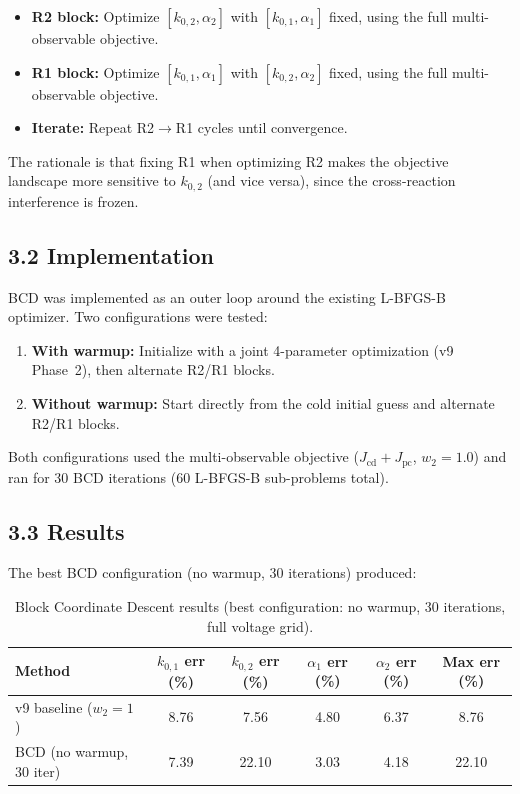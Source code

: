 \documentclass[11pt]{article}
\begin{document}
\begin{itemize}
  \item \textbf{R2 block:} Optimize $[k_{0,2}, \alpha_2]$ with $[k_{0,1},
        \alpha_1]$ fixed, using the full multi-observable objective.
  \item \textbf{R1 block:} Optimize $[k_{0,1}, \alpha_1]$ with $[k_{0,2},
        \alpha_2]$ fixed, using the full multi-observable objective.
  \item \textbf{Iterate:} Repeat R2$\to$R1 cycles until convergence.
\end{itemize}

The rationale is that fixing R1 when optimizing R2 makes the objective
landscape more sensitive to $k_{0,2}$ (and vice versa), since the cross-reaction
interference is frozen.

\subsection*{3.2 Implementation}

BCD was implemented as an outer loop around the existing L-BFGS-B optimizer.
Two configurations were tested:
\begin{enumerate}
  \item \textbf{With warmup:} Initialize with a joint 4-parameter optimization
        (v9 Phase~2), then alternate R2/R1 blocks.
  \item \textbf{Without warmup:} Start directly from the cold initial guess
        and alternate R2/R1 blocks.
\end{enumerate}
Both configurations used the multi-observable objective ($J_{\text{cd}} +
J_{\text{pc}}$, $w_2 = 1.0$) and ran for 30 BCD iterations (60 L-BFGS-B
sub-problems total).

\subsection*{3.3 Results}

The best BCD configuration (no warmup, 30 iterations) produced:

\begin{table}[H]
  \centering
  \caption{Block Coordinate Descent results (best configuration: no warmup,
           30 iterations, full voltage grid).}
  \label{tab:bcd}
  \begin{tabular}{l S[round-precision=2] S[round-precision=2]
                    S[round-precision=2] S[round-precision=2]
                    S[round-precision=2]}
    \toprule
    Method & {$k_{0,1}$ err (\%)} & {$k_{0,2}$ err (\%)}
           & {$\alpha_1$ err (\%)} & {$\alpha_2$ err (\%)}
           & {Max err (\%)} \\
    \midrule
    v9 baseline ($w_2 = 1$) &  8.76 &  7.56 & 4.80 & 6.37 &  8.76 \\
    BCD (no warmup, 30 iter) & 7.39 & 22.10 & 3.03 & 4.18 & 22.10 \\
    \bottomrule
  \end{tabular}
\end{table}
\end{document}
